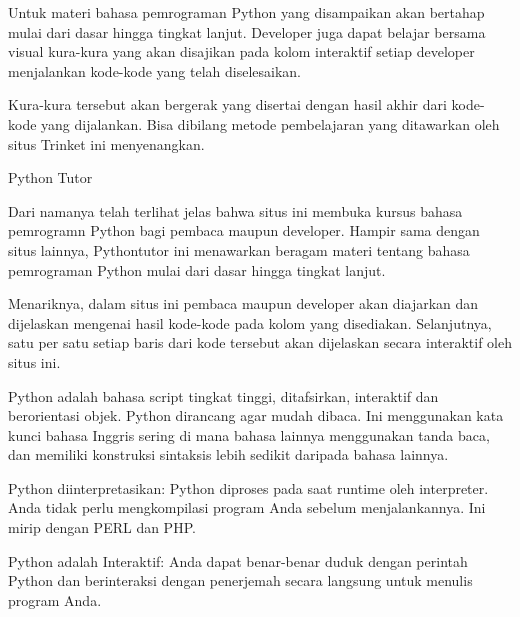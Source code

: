 \noindent 
{\fontsize{14pt}{14pt}\selectfont Untuk materi bahasa pemrograman Python yang disampaikan akan bertahap mulai dari dasar hingga tingkat lanjut. Developer juga dapat belajar bersama visual kura-kura yang akan disajikan pada kolom interaktif setiap developer menjalankan kode-kode yang telah diselesaikan. \\} \par
\noindent 
{\fontsize{14pt}{14pt}\selectfont Kura-kura tersebut akan bergerak yang disertai dengan hasil akhir dari kode-kode yang dijalankan. Bisa dibilang metode pembelajaran yang ditawarkan oleh situs Trinket ini menyenangkan. \\} \par
\vspace{14pt}
\noindent 
{\fontsize{14pt}{14pt}\selectfont Python Tutor \\} \par
\noindent 
{\fontsize{14pt}{14pt}\selectfont Dari namanya telah terlihat jelas bahwa situs ini membuka kursus bahasa pemrogramn Python bagi pembaca maupun developer. Hampir sama dengan situs lainnya, Pythontutor ini menawarkan beragam materi tentang bahasa pemrograman Python mulai dari dasar hingga tingkat lanjut. \\} \par
\noindent 
{\fontsize{14pt}{14pt}\selectfont Menariknya, dalam situs ini pembaca maupun developer akan diajarkan dan dijelaskan mengenai hasil kode-kode pada kolom yang disediakan. Selanjutnya, satu per satu setiap baris dari kode tersebut akan dijelaskan secara interaktif oleh situs ini. \\} \par
\noindent 
{\fontsize{14pt}{14pt}\selectfont Python adalah bahasa script tingkat tinggi, ditafsirkan, interaktif dan berorientasi objek. Python dirancang agar mudah dibaca. Ini menggunakan kata kunci bahasa Inggris sering di mana bahasa lainnya menggunakan tanda baca, dan memiliki konstruksi sintaksis lebih sedikit daripada bahasa lainnya. \\} \par
\vspace{14pt}
\noindent 
{\fontsize{14pt}{14pt}\selectfont Python diinterpretasikan: Python diproses pada saat runtime oleh interpreter. Anda tidak perlu mengkompilasi program Anda sebelum menjalankannya. Ini mirip dengan PERL dan PHP. \\} \par
\vspace{14pt}
\noindent 
{\fontsize{14pt}{14pt}\selectfont Python adalah Interaktif: Anda dapat benar-benar duduk dengan perintah Python dan berinteraksi dengan penerjemah secara langsung untuk menulis program Anda. \\} \par
